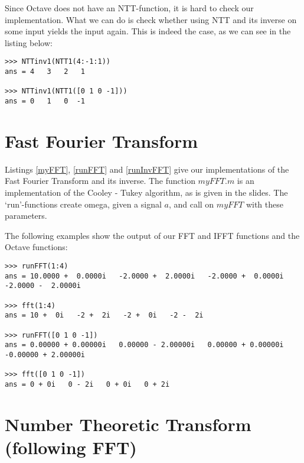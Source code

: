 \documentclass{article}
\begin{document}
Since Octave does not have an NTT-function, it is hard to check our implementation.
What we can do is check whether using NTT and its inverse on some input yields
the input again. This is indeed the case, as we can see in the listing below:

\begin{lstlisting}
>>> NTTinv1(NTT1(4:-1:1))
ans = 4   3   2   1

>>> NTTinv1(NTT1([0 1 0 -1]))
ans = 0   1   0  -1
\end{lstlisting}

 
 
 

\section{Fast Fourier Transform}
Listings \ref{myFFT}, \ref{runFFT} and \ref{runInvFFT} give our implementations of the Fast Fourier Transform and its inverse. The function $myFFT.m$ is an implementation of the Cooley - Tukey algorithm, as is given in the slides. The `run'-functions create omega, given a signal $a$, and call on $myFFT$ with these parameters.

The following examples show the output of our FFT and IFFT functions and the Octave functions:

\begin{lstlisting}
>>> runFFT(1:4)
ans = 10.0000 +  0.0000i   -2.0000 +  2.0000i   -2.0000 +  0.0000i   -2.0000 -  2.0000i

>>> fft(1:4)
ans = 10 +  0i   -2 +  2i   -2 +  0i   -2 -  2i

>>> runFFT([0 1 0 -1])
ans = 0.00000 + 0.00000i   0.00000 - 2.00000i   0.00000 + 0.00000i   -0.00000 + 2.00000i

>>> fft([0 1 0 -1])
ans = 0 + 0i   0 - 2i   0 + 0i   0 + 2i
\end{lstlisting}

 
 
 

\section{Number Theoretic Transform (following FFT)}
\end{document}
